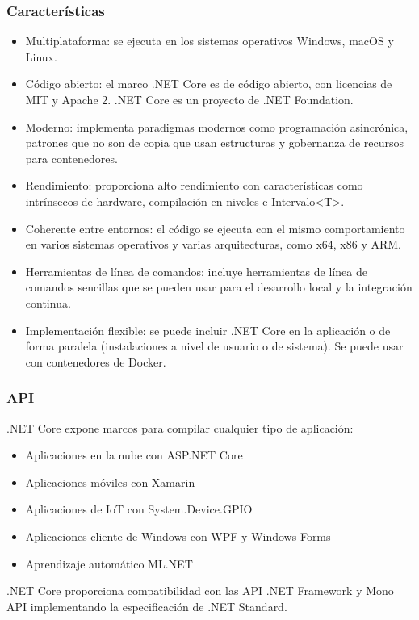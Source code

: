 \subsubsection{Características}
\begin{itemize}
    \item Multiplataforma: se ejecuta en los sistemas operativos Windows, macOS y Linux.
    \item Código abierto: el marco .NET Core es de código abierto, con licencias de MIT y Apache 2. .NET Core es un proyecto de .NET Foundation.
    \item Moderno: implementa paradigmas modernos como programación asincrónica, patrones que no son de copia que usan estructuras y gobernanza de recursos para contenedores.
    \item Rendimiento: proporciona alto rendimiento con características como intrínsecos de hardware, compilación en niveles e Intervalo<T>.
    \item Coherente entre entornos: el código se ejecuta con el mismo comportamiento en varios sistemas operativos y varias arquitecturas, como x64, x86 y ARM.
    \item Herramientas de línea de comandos: incluye herramientas de línea de comandos sencillas que se pueden usar para el desarrollo local y la integración continua.
    \item Implementación flexible: se puede incluir .NET Core en la aplicación o de forma paralela (instalaciones a nivel de usuario o de sistema). Se puede usar con contenedores de Docker.
\end{itemize}

\subsubsection{API}
.NET Core expone marcos para compilar cualquier tipo de aplicación:
\begin{itemize}
\item Aplicaciones en la nube con ASP.NET Core
\item Aplicaciones móviles con Xamarin
\item Aplicaciones de IoT con System.Device.GPIO
\item Aplicaciones cliente de Windows con WPF y Windows Forms
\item Aprendizaje automático ML.NET
\end{itemize}

.NET Core proporciona compatibilidad con las API .NET Framework y Mono API implementando la especificación de .NET Standard.

